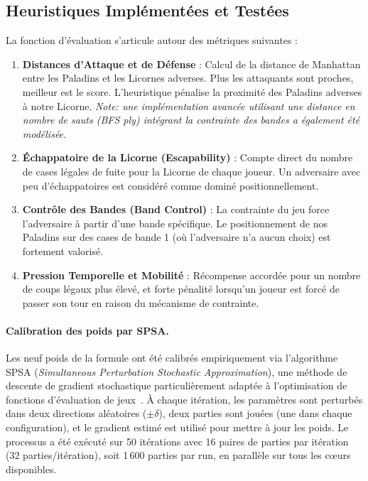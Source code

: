 \documentclass[12pt,a4paper]{article}
\begin{document}
\subsection{Heuristiques Implémentées et Testées}
La fonction d'évaluation s'articule autour des métriques suivantes :
\begin{enumerate}
    \item \textbf{Distances d'Attaque et de Défense} : Calcul de la distance de Manhattan entre les Paladins et les Licornes adverses. Plus les attaquants sont proches, meilleur est le score. L'heuristique pénalise la proximité des Paladins adverses à notre Licorne. \textit{Note: une implémentation avancée utilisant une distance en nombre de sauts (BFS ply) intégrant la contrainte des bandes a également été modélisée.}
    \item \textbf{Échappatoire de la Licorne (Escapability)} : Compte direct du nombre de cases légales de fuite pour la Licorne de chaque joueur. Un adversaire avec peu d'échappatoires est considéré comme dominé positionnellement.
    \item \textbf{Contrôle des Bandes (Band Control)} : La contrainte du jeu force l'adversaire à partir d'une bande spécifique. Le positionnement de nos Paladins sur des cases de bande 1 (où l'adversaire n'a aucun choix) est fortement valorisé.
    \item \textbf{Pression Temporelle et Mobilité} : Récompense accordée pour un nombre de coups légaux plus élevé, et forte pénalité lorsqu'un joueur est forcé de passer son tour en raison du mécanisme de contrainte.
\end{enumerate}

\paragraph{Calibration des poids par SPSA.}
Les neuf poids de la formule ont été calibrés empiriquement via l'algorithme SPSA (\textit{Simultaneous Perturbation Stochastic Approximation}), une méthode de descente de gradient stochastique particulièrement adaptée à l'optimisation de fonctions d'évaluation de jeux~\cite{cp_testing}. À chaque itération, les paramètres sont perturbés dans deux directions aléatoires ($\pm \delta$), deux parties sont jouées (une dans chaque configuration), et le gradient estimé est utilisé pour mettre à jour les poids. Le processus a été exécuté sur 50 itérations avec 16 paires de parties par itération (32 parties/itération), soit 1\,600 parties par run, en parallèle sur tous les cœurs disponibles.
\end{document}
